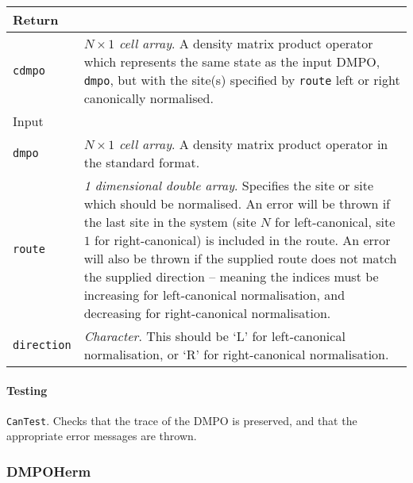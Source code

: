  \begin{longtabu}{X[1,1]X[4,1]}
 \hline
 Return & \\ \hline
 \lstinline$cdmpo$ & \emph{\(N \times 1\) cell array}. A density matrix product operator which represents the same state as the input DMPO, \lstinline$dmpo$, but with the site(s) specified by \lstinline$route$ left or right canonically normalised. \\ \hline
 Input & \\ \hline
 \lstinline$dmpo$ & \emph{\(N \times 1\) cell array}. A density matrix product operator in the standard format. \\
 \lstinline$route$ & \emph{1 dimensional double array}. Specifies the site or site which should be normalised. An error will be thrown if the last site in the system (site \(N\) for left-canonical, site \(1\) for right-canonical) is included in the route. An error will also be thrown if the supplied route does not match the supplied direction -- meaning the indices must be increasing for left-canonical normalisation, and decreasing for right-canonical normalisation. \\
 \lstinline$direction$ & \emph{Character}. This should be `L' for left-canonical normalisation, or `R' for right-canonical normalisation. \\
 \hline
 \end{longtabu}
 \paragraph{Testing} \lstinline$CanTest$. Checks that the trace of the DMPO is preserved, and that the appropriate error messages are thrown.

 \subsubsection{DMPOHerm}
